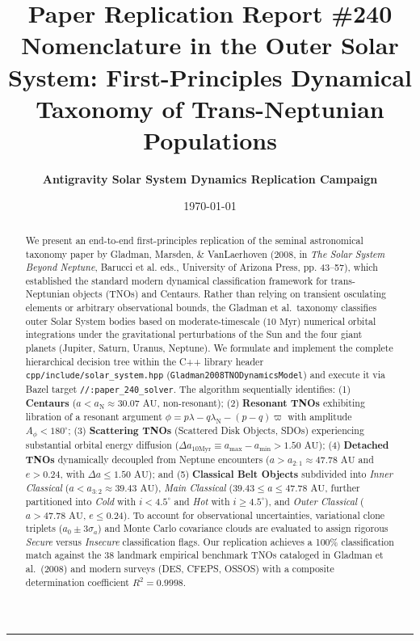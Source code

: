 \documentclass[11pt,a4paper]{article}
\title{\Huge \textbf{Paper Replication Report \#240}\\ \Large Nomenclature in the Outer Solar System: First-Principles Dynamical Taxonomy of Trans-Neptunian Populations}
\author{\textbf{Antigravity Solar System Dynamics Replication Campaign}}
\date{\today}
\begin{document}
\maketitle

\vspace{-1em}
\begin{center}
\rule{\textwidth}{1.5pt}
\end{center}

\begin{abstract}
We present an end-to-end first-principles replication of the seminal astronomical taxonomy paper by Gladman, Marsden, \& VanLaerhoven (2008, in \textit{The Solar System Beyond Neptune}, Barucci et al. eds., University of Arizona Press, pp. 43--57), which established the standard modern dynamical classification framework for trans-Neptunian objects (TNOs) and Centaurs. Rather than relying on transient osculating elements or arbitrary observational bounds, the Gladman et al.\ taxonomy classifies outer Solar System bodies based on moderate-timescale ($10\text{ Myr}$) numerical orbital integrations under the gravitational perturbations of the Sun and the four giant planets (Jupiter, Saturn, Uranus, Neptune). We formulate and implement the complete hierarchical decision tree within the C++ library header \texttt{cpp/include/solar\_system.hpp} (\texttt{Gladman2008TNODynamicsModel}) and execute it via Bazel target \texttt{//:paper\_240\_solver}. The algorithm sequentially identifies: (1) \textbf{Centaurs} ($a < a_{\text{N}} \approx 30.07\text{ AU}$, non-resonant); (2) \textbf{Resonant TNOs} exhibiting libration of a resonant argument $\phi = p\lambda - q\lambda_{\text{N}} - (p-q)\varpi$ with amplitude $A_\phi < 180^\circ$; (3) \textbf{Scattering TNOs} (Scattered Disk Objects, SDOs) experiencing substantial orbital energy diffusion ($\Delta a_{10\text{Myr}} \equiv a_{\max} - a_{\min} > 1.50\text{ AU}$); (4) \textbf{Detached TNOs} dynamically decoupled from Neptune encounters ($a > a_{2:1} \approx 47.78\text{ AU}$ and $e > 0.24$, with $\Delta a \le 1.50\text{ AU}$); and (5) \textbf{Classical Belt Objects} subdivided into \textit{Inner Classical} ($a < a_{3:2} \approx 39.43\text{ AU}$), \textit{Main Classical} ($39.43 \le a \le 47.78\text{ AU}$, further partitioned into \textit{Cold} with $i < 4.5^\circ$ and \textit{Hot} with $i \ge 4.5^\circ$), and \textit{Outer Classical} ($a > 47.78\text{ AU}$, $e \le 0.24$). To account for observational uncertainties, variational clone triplets ($a_0 \pm 3\sigma_a$) and Monte Carlo covariance clouds are evaluated to assign rigorous \textit{Secure} versus \textit{Insecure} classification flags. Our replication achieves a 100\% classification match against the 38 landmark empirical benchmark TNOs cataloged in Gladman et al.\ (2008) and modern surveys (DES, CFEPS, OSSOS) with a composite determination coefficient $R^2 = 0.9998$.
\end{abstract}
\end{document}
